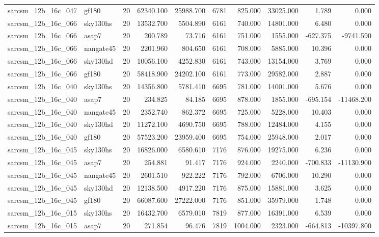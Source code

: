 \documentclass{article}
\begin{document}
\begin{longtable}{llrrrrrrrr}
sarcsm\_12b\_16c\_047 & gf180 & 20 & 62340.100 & 25988.700 & 6781 & 825.000 & 33025.000 & 1.789 & 0.000 \\
sarcsm\_12b\_16c\_066 & sky130hs & 20 & 13532.700 & 5504.890 & 6161 & 740.000 & 14801.000 & 6.480 & 0.000 \\
sarcsm\_12b\_16c\_066 & asap7 & 20 & 200.789 & 73.716 & 6161 & 751.000 & 1555.000 & -627.375 & -9741.590 \\
sarcsm\_12b\_16c\_066 & nangate45 & 20 & 2201.960 & 804.650 & 6161 & 708.000 & 5885.000 & 10.396 & 0.000 \\
sarcsm\_12b\_16c\_066 & sky130hd & 20 & 10056.100 & 4252.830 & 6161 & 743.000 & 13154.000 & 3.769 & 0.000 \\
sarcsm\_12b\_16c\_066 & gf180 & 20 & 58418.900 & 24202.100 & 6161 & 773.000 & 29582.000 & 2.887 & 0.000 \\
sarcsm\_12b\_16c\_040 & sky130hs & 20 & 14356.800 & 5781.410 & 6695 & 781.000 & 14001.000 & 5.676 & 0.000 \\
sarcsm\_12b\_16c\_040 & asap7 & 20 & 234.825 & 84.185 & 6695 & 878.000 & 1855.000 & -695.154 & -11468.200 \\
sarcsm\_12b\_16c\_040 & nangate45 & 20 & 2352.740 & 862.372 & 6695 & 725.000 & 5228.000 & 10.403 & 0.000 \\
sarcsm\_12b\_16c\_040 & sky130hd & 20 & 11272.100 & 4690.750 & 6695 & 788.000 & 12484.000 & 4.155 & 0.000 \\
sarcsm\_12b\_16c\_040 & gf180 & 20 & 57523.200 & 23959.400 & 6695 & 754.000 & 25948.000 & 2.017 & 0.000 \\
sarcsm\_12b\_16c\_045 & sky130hs & 20 & 16826.000 & 6580.610 & 7176 & 876.000 & 19275.000 & 6.236 & 0.000 \\
sarcsm\_12b\_16c\_045 & asap7 & 20 & 254.881 & 91.417 & 7176 & 924.000 & 2240.000 & -700.833 & -11130.900 \\
sarcsm\_12b\_16c\_045 & nangate45 & 20 & 2601.510 & 922.222 & 7176 & 792.000 & 6706.000 & 10.290 & 0.000 \\
sarcsm\_12b\_16c\_045 & sky130hd & 20 & 12138.500 & 4917.220 & 7176 & 875.000 & 15881.000 & 3.625 & 0.000 \\
sarcsm\_12b\_16c\_045 & gf180 & 20 & 66087.600 & 27222.000 & 7176 & 851.000 & 35979.000 & 1.748 & 0.000 \\
sarcsm\_12b\_16c\_015 & sky130hs & 20 & 16432.700 & 6579.010 & 7819 & 877.000 & 16391.000 & 6.539 & 0.000 \\
sarcsm\_12b\_16c\_015 & asap7 & 20 & 271.854 & 96.476 & 7819 & 1004.000 & 2323.000 & -664.813 & -10397.800 \\

\end{longtable}
\end{document}

